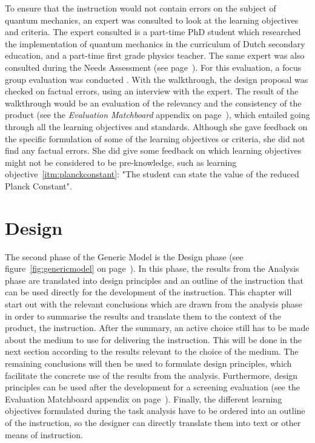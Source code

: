 \documentclass[11pt,twoside]{report} %
\begin{document}
To ensure that the instruction would not contain errors on the subject of quantum mechanics, an expert was consulted to look at the learning objectives and criteria. The expert consulted is a part-time PhD student which researched the implementation of quantum mechanics in the curriculum of Dutch secondary education, and a part-time first grade physics teacher. The same expert was also consulted during the Needs Assessment (see page~\pageref{sssec:problem}). For this evaluation, a focus group evaluation was conducted \cite{evamatchboard}. With the walkthrough, the design proposal was checked on factual errors, using an interview with the expert. The result of the walkthrough would be an evaluation of the relevancy and the consistency of the product (see the \emph{Evaluation Matchboard} appendix on page~\pageref{app:evamatchboard}), which entailed going through all the learning objectives and standards. Although she gave  feedback on the specific formulation of some of the learning objectives or criteria, she did not find any factual errors. She did give some feedback on which learning objectives might not be considered to be pre-knowledge, such as learning objective~\ref{itm:planckconstant}: "The student can state the value of the reduced Planck Constant".


\chapter{Design}
\thispagestyle{fancy}

The second phase of the Generic Model is the Design phase \cite{genericmodel} (see figure~\ref{fig:genericmodel} on page~\pageref{fig:genericmodel}). In this phase, the results from the Analysis phase are translated into design principles and an outline of the instruction that can be used directly for the development of the instruction. This chapter will start out with the relevant conclusions which are drawn from the analysis phase in order to summarise the results and translate them to the context of the product, the instruction. After the summary, an active choice still has to be made about the medium to use for delivering the instruction. This will be done in the next section according to the results relevant to the choice of the medium. The remaining conclusions will then be used to formulate design principles, which facilitate the concrete use of the results from the analysis. Furthermore, design principles can be used after the development for a screening evaluation \cite{evamatchboard} (see the Evaluation Matchboard appendix on page~\pageref{app:evamatchboard}). Finally, the different learning objectives formulated during the task analysis have to be ordered into an outline of the instruction, so the designer can directly translate them into text or other means of instruction.
\end{document}
